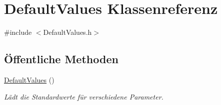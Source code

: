 \hypertarget{classDefaultValues}{\section{Default\-Values Klassenreferenz}
\label{classDefaultValues}
}


{\ttfamily \#include $<$Default\-Values.\-h$>$}

\subsection*{Öffentliche Methoden}
\begin{DoxyCompactItemize}
\item 
\hyperlink{classDefaultValues_ad960d7716705d593d4f1e203c2f64c1d}{Default\-Values} ()
\begin{DoxyCompactList}\small\item\em Lädt die Standardwerte für verschiedene Parameter. \end{DoxyCompactList}\end{DoxyCompactItemize}
